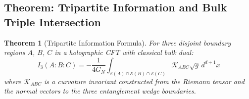 \documentclass[12pt,a4paper]{article}
\newtheorem{theorem}{Theorem}[section]
\begin{document}
\subsection{Theorem: Tripartite Information and Bulk Triple Intersection}

\begin{theorem}[Tripartite Information Formula]\label{thm:tripartite}
For three disjoint boundary regions $A$, $B$, $C$ in a holographic CFT with classical bulk dual:
\begin{equation}
I_3(A:B:C) = -\frac{1}{4G_N} \int_{\mathcal{E}(A) \cap \mathcal{E}(B) \cap \mathcal{E}(C)} \mathcal{K}_{ABC} \sqrt{g} \, d^{d+1}x
\end{equation}
where $\mathcal{K}_{ABC}$ is a curvature invariant constructed from the Riemann tensor and the normal vectors to the three entanglement wedge boundaries.
\end{theorem}
\end{document}
